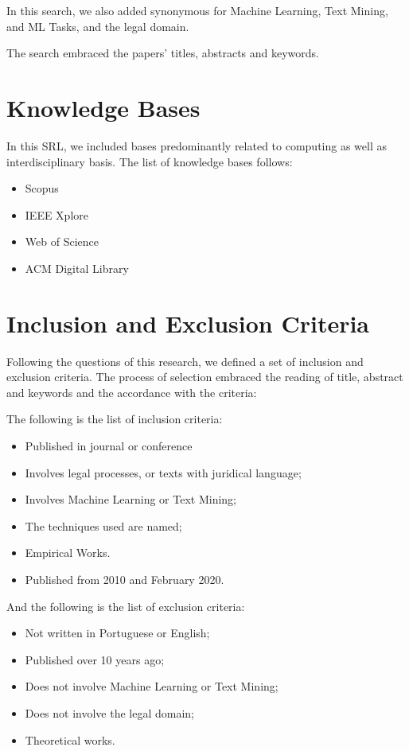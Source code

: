 In this search, we also added synonymous for Machine Learning, Text Mining, and ML Tasks, and the legal domain.

The search embraced the papers' titles, abstracts and keywords.

\section{Knowledge Bases}

In this SRL, we included bases predominantly related to computing as well as interdisciplinary basis.  The list of knowledge bases follows:

\begin{itemize}[noitemsep]
    \item Scopus
    \item IEEE Xplore
    \item Web of Science
    \item ACM Digital Library
\end{itemize}

\section{Inclusion and Exclusion Criteria}

Following the questions of this research, we defined a set of inclusion and exclusion criteria. The process of selection embraced the reading of title, abstract and keywords and the accordance with the criteria:

The following is the list of inclusion criteria:

\begin{itemize}[noitemsep]
    \item Published in journal or conference
    \item Involves legal processes, or texts with juridical language;
    \item Involves Machine Learning or Text Mining;
    \item The techniques used are named;
    \item Empirical Works.
    \item Published from 2010 and February 2020.
\end{itemize}

And the following is the list of exclusion criteria:

\begin{itemize}[noitemsep]
    \item Not written in Portuguese or English;
    \item Published over 10 years ago;
    \item Does not involve Machine Learning or Text Mining;
    \item Does not involve the legal domain;
    \item Theoretical works.
\end{itemize}


